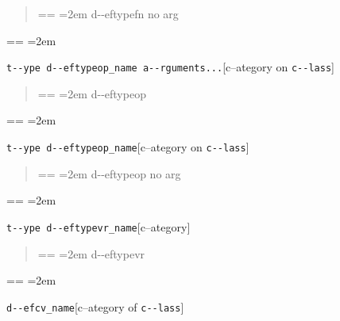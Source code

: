 \documentclass{book}
\makeatletter
\newenvironment{GNUTexinfopreformatted}{%
  \par\obeylines\obeyspaces\frenchspacing
  \parskip=\z@\parindent=\z@}{}
\makeatother
\begin{document}
%
\begin{quote}
\unskip{\parskip=0pt\noindent}%
\begin{GNUTexinfopreformatted}
\leftskip=2em\relax\ttfamily%
d{-}{-}eftypefn no arg
\end{GNUTexinfopreformatted}
\end{quote}
\begin{GNUTexinfopreformatted}
\leftskip=2em\relax\ttfamily%

\end{GNUTexinfopreformatted}
\noindent\texttt{t{-}{-}ype d{-}{-}eftypeop\_name a{-}{-}rguments...}\hfill[c--ategory on \texttt{c{-}{-}lass}]

%
\begin{quote}
\unskip{\parskip=0pt\noindent}%
\begin{GNUTexinfopreformatted}
\leftskip=2em\relax\ttfamily%
d{-}{-}eftypeop
\end{GNUTexinfopreformatted}
\end{quote}
\begin{GNUTexinfopreformatted}
\leftskip=2em\relax\ttfamily%

\end{GNUTexinfopreformatted}
\noindent\texttt{t{-}{-}ype d{-}{-}eftypeop\_name}\hfill[c--ategory on \texttt{c{-}{-}lass}]

%
\begin{quote}
\unskip{\parskip=0pt\noindent}%
\begin{GNUTexinfopreformatted}
\leftskip=2em\relax\ttfamily%
d{-}{-}eftypeop no arg
\end{GNUTexinfopreformatted}
\end{quote}
\begin{GNUTexinfopreformatted}
\leftskip=2em\relax\ttfamily%

\end{GNUTexinfopreformatted}
\noindent\texttt{t{-}{-}ype d{-}{-}eftypevr\_name}\hfill[c--ategory]

%
\begin{quote}
\unskip{\parskip=0pt\noindent}%
\begin{GNUTexinfopreformatted}
\leftskip=2em\relax\ttfamily%
d{-}{-}eftypevr
\end{GNUTexinfopreformatted}
\end{quote}
\begin{GNUTexinfopreformatted}
\leftskip=2em\relax\ttfamily%

\end{GNUTexinfopreformatted}
\noindent\texttt{d{-}{-}efcv\_name}\hfill[c--ategory of \texttt{c{-}{-}lass}]
\end{document}
